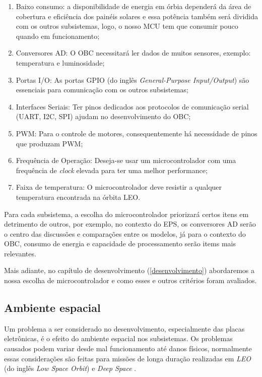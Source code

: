 \begin{enumerate}
    \item Baixo consumo: a disponibilidade de energia em órbia dependerá da área de cobertura e eficiência dos painéis solares e essa potência também será dividida com os outros subsistemas, logo, o nosso MCU tem que consumir pouco quando em funcionamento;
    \item Conversores AD: O OBC necessitará ler dados de muitos sensores, exemplo: temperatura e luminosidade;
    \item Portas I/O: As portas GPIO (do inglês \textit{General-Purpose Input/Output}) são essenciais para comunicação com os outros subsistemas;
    \item Interfaces Seriais: Ter pinos dedicados aos protocolos de comunicação serial (UART, I2C, SPI) ajudam no desenvolvimento do OBC;
    \item PWM: Para o controle de motores, consequentemente há necessidade de pinos que produzam PWM;
    \item Frequência de Operação: Deseja-se usar um microcontrolador com uma frequência de \textit{clock} elevada para ter uma melhor performance;
    \item Faixa de temperatura: O microcontrolador deve resistir a qualquer temperatura encontrada na órbita LEO.
\end{enumerate}

Para cada subsistema, a escolha do microcontrolador priorizará certos itens em detrimento de outros, por exemplo, no contexto do EPS, os conversores AD serão o centro das discussões e comparações entre os modelos, já para o contexto do OBC, consumo de energia e capacidade de processamento serão items mais relevantes.

Mais adiante, no capítulo de desenvolvimento (\ref{desenvolvimento}) abordaremos a nossa escolha de microcontrolador e como esses e outros critérios foram avaliados.

\subsection{Ambiente espacial}
Um problema a ser considerado no desenvolvimento, especialmente das placas eletrônicas, é o efeito do ambiente espacial nos subsistemas. Os problemas causados podem variar desde mal funcionamento até danos físicos, normalmente essas considerações são feitas para missões de longa duração realizadas em \textit{LEO} (do inglês \textit{Low Space Orbit}) e \textit{Deep Space} \cite{nasa_state_of_art}.

